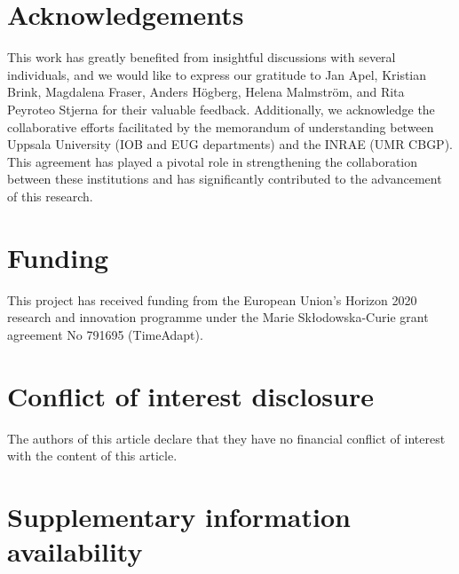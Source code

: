 \documentclass[a4paper]{article}
\begin{document}
\section*{\centering Acknowledgements}


This work has greatly benefited from insightful discussions with several individuals, and we would like to express our gratitude to Jan Apel, Kristian Brink, Magdalena Fraser, Anders Högberg, Helena Malmström, and Rita Peyroteo Stjerna for their valuable feedback. Additionally, we acknowledge the collaborative efforts facilitated by the memorandum of understanding between Uppsala University (IOB and EUG departments) and the INRAE (UMR CBGP). This agreement has played a pivotal role in strengthening the collaboration between these institutions and has significantly contributed to the advancement of this research.
\\

\section*{\centering Funding}

This project has received funding from the European Union’s Horizon 2020 research and innovation programme under the Marie Skłodowska-Curie grant agreement No 791695 (TimeAdapt).
\\


\section*{\centering Conflict of interest disclosure}

The authors of this article declare that they have no financial conflict of interest with the content of this article.
\\



\section*{\centering Supplementary information availability}
\end{document}
